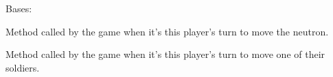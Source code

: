 \documentclass[letterpaper,10pt,english,openany,oneside]{sphinxmanual}
\begin{document}

\begin{fulllineitems}
\label{\detokenize{player:player.RandomPlayer}}
Bases: {\hyperref[\detokenize{player:player.Player}]{}}

\begin{fulllineitems}
\label{\detokenize{player:player.RandomPlayer.move_neutron}}
Method called by the game when it’s this player’s turn to move the
neutron.

\end{fulllineitems}


\begin{fulllineitems}
\label{\detokenize{player:player.RandomPlayer.move_soldier}}
Method called by the game when it’s this player’s turn to move one of
their soldiers.

\end{fulllineitems}


\end{fulllineitems}

\end{document}
